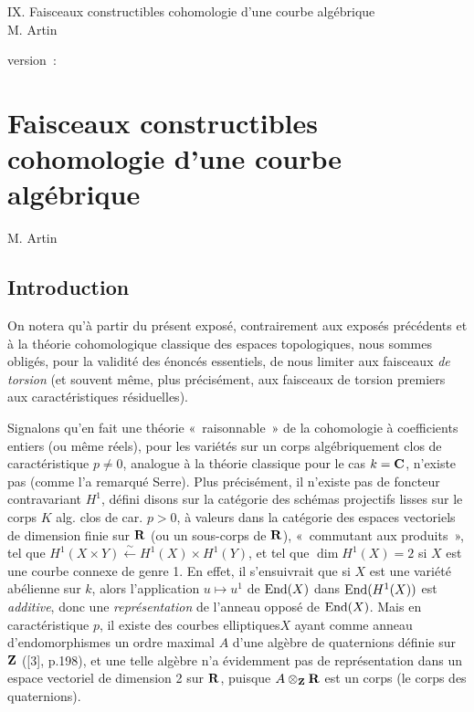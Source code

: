 \documentclass[10pt]{../fichiers-configuration-latex/smfart}
\begin{document}
\begin{center}
IX. Faisceaux constructibles cohomologie d'une courbe algébrique\\
M. Artin 
\end{center}

version : \showgitstatus{}
\tableofcontents

\else
\chapter{Faisceaux constructibles cohomologie d'une courbe algébrique}
\begin{center}
M. Artin 
\end{center}
\fi

\setcounter{pageoriginal}{0}

\setcounter{section}{-1}
\section{Introduction}\pageoriginale

On notera qu'à partir du présent exposé, contrairement aux exposés
précédents et à la théorie cohomologique classique des espaces
topologiques, nous sommes obligés, pour la validité des énoncés
essentiels, de nous limiter aux faisceaux \emph{de torsion} (et
souvent même, plus précisément, aux faisceaux de torsion premiers aux
caractéristiques résiduelles).

Signalons qu'en fait une théorie « raisonnable »  de la
cohomologie à coefficients entiers (ou même réels), pour les variétés
sur un corps algébriquement clos de caractéristique $p\neq 0$,
analogue à la théorie classique pour le cas
$k=\mathbf{C}$, n'existe
pas (comme l'a remarqué Serre). Plus précisément, il n'existe pas de
foncteur contravariant $H^1$, défini disons sur la catégorie des
schémas projectifs lisses sur le corps $K$ alg. clos de car. $p> 0$, à
valeurs dans la catégorie des espaces vectoriels de dimension finie
sur $\mathbf{R}$  (ou un sous-corps de $\mathbf{R}$),
« commutant aux produits », \ie tel que $H^1(X\times
Y)\xleftarrow{\sim}H^1(X)\times H^1(Y)$, et tel que $\dim H^1(X)=2$ si
$X$ est une courbe connexe de genre 1. En effet, il s'ensuivrait que
si $X$ est une variété abélienne sur $k$, alors l'application
$u\mapsto u^1$ de $\operatorname{End}(X)$ dans $\operatorname{End}(H^1(X))$ est \emph{additive},
donc une \emph{représentation} de l'anneau opposé de $\operatorname{End}(X)$. Mais
en caractéristique $p$, il existe des courbes
elliptiques\pageoriginale $X$ ayant comme anneau d'endomorphismes un
ordre maximal $A$ d'une algèbre de quaternions définie sur
$\mathbf{Z}$ ([3], p.198), et une telle algèbre n'a
évidemment pas de représentation dans un espace vectoriel de dimension
2 sur $\mathbf{R}$, puisque
$A\otimes_{\mathbf{Z}}\mathbf{R}$ est un corps
(le corps des quaternions).
\end{document}
